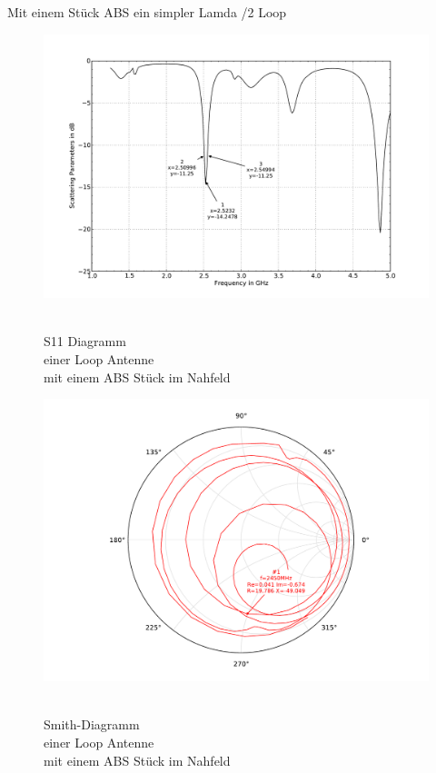Mit einem Stück ABS ein simpler Lamda /2 Loop\\
\begin{figure}[!ht]
\begin{center}
  \includegraphics[width=\linewidth]{content/bilder/Evaluation/Loop/mit1ABS/S11_Loop_Coil_1ABS.pdf}
  \caption{\\S11 Diagramm \\einer Loop Antenne \\mit einem ABS Stück im Nahfeld}\label{fig:S11_Loop_1ABS_3}
\endminipage%
{}
  \includegraphics[width=\linewidth]{content/bilder/Evaluation/Loop/mit1ABS/Smith_Loop_Coil_1ABS.pdf}
  \caption{\\Smith-Diagramm \\einer Loop Antenne \\ mit einem ABS Stück im Nahfeld}\label{fig:Smith_Loop_1ABS_4}
\endminipage
\end{center}
\end{figure}

